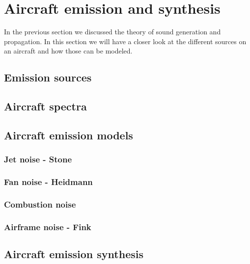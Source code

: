 \section{Aircraft emission and synthesis}

In the previous section we discussed the theory of sound generation and propagation.
In this section we will have a closer look at the different sources on an
aircraft and how those can be modeled.

\subsection{Emission sources}

\subsection{Aircraft spectra}\label{sec:theory_aircraft_emission_aircraft_spectra}

\subsection{Aircraft emission models}\label{sec:theory_aircraft_emission_models}

\subsubsection{Jet noise - Stone}

\subsubsection{Fan noise - Heidmann}

\subsubsection{Combustion noise}

\subsubsection{Airframe noise - Fink}

\subsection{Aircraft emission synthesis}

